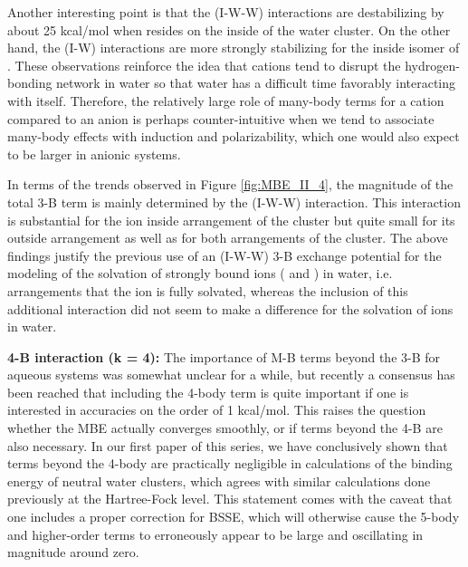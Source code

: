 \documentclass[11pt, proquest]{uwthesis}[2020/02/24]
\let\ce\ch
\begin{document}
\par Another interesting point is that the (I-W-W) interactions are destabilizing by about 25 kcal/mol when \ce{Li^+} resides on the inside of the water cluster. On the other hand, the (I-W) interactions are more strongly stabilizing for the inside isomer of \ce{Li^+(H2O)9}. These observations reinforce the idea that cations tend to disrupt the hydrogen-bonding network in water so that water has a difficult time favorably interacting with itself. Therefore, the relatively large role of many-body terms for a cation compared to an anion is perhaps counter-intuitive when we tend to associate many-body effects with induction and polarizability,\autocite{heindel_origin_2018,zhuang_many-body_2019} which one would also expect to be larger in anionic systems.

\par In terms of the trends observed in Figure \ref{fig:MBE_II_4}, the magnitude of the total 3-B term is mainly determined by the (I-W-W) interaction. This interaction is substantial for the ion inside arrangement of the \ce{Li^+(H2O)9} cluster but quite small for its outside arrangement as well as for both arrangements of the \ce{Cl^-(H2O)9} cluster. The above findings justify the previous use of an (I-W-W) 3-B exchange potential for the modeling of the solvation of strongly bound ions (\ce{Li^+} and \ce{F^-}) in water, i.e. arrangements that the ion is fully solvated,\autocite{dang_ion_1991,xantheas_critical_1996} whereas the inclusion of this additional interaction did not seem to make a difference for the solvation of \ce{Cl^-} ions in water.\autocite{perera_structures_1994}

\textbf{4-B interaction (k = 4):} The importance of M-B terms beyond the 3-B for aqueous systems was somewhat unclear for a while, but recently a consensus has been reached that including the 4-body term is quite important if one is interested in accuracies on the order of 1 kcal/mol.\autocite{heindel_benchmark_2018,lao_understanding_2016,richard_aiming_2014,howard_n-body_2013} This raises the question whether the MBE actually converges smoothly, or if terms beyond the 4-B are also necessary. In our first paper of this series,\autocite{heindel_many-body_2020} we have conclusively shown that terms beyond the 4-body are practically negligible in calculations of the binding energy of neutral water clusters, which agrees with similar calculations done previously at the Hartree-Fock level.\autocite{ouyang_trouble_2014,ouyang_many-body_2015} This statement comes with the caveat that one includes a proper correction for BSSE, which will otherwise cause the 5-body and higher-order terms to erroneously appear to be large and oscillating in magnitude around zero.
\end{document}
